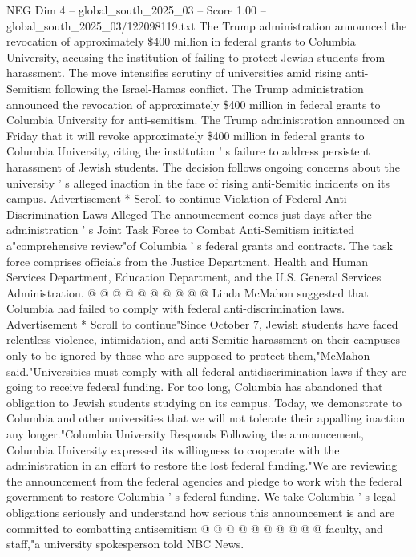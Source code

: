 \begin{textsample}{NEG Dim 4 – global\_south\_2025\_03 – Score 1.00 – global\_south\_2025\_03/122098119.txt}  \label{ex:f4_neg_422}
The Trump administration announced the revocation of approximately \$400 million in federal grants to Columbia University, accusing the institution of failing to protect Jewish students from harassment.
The move intensifies scrutiny of universities amid rising anti-Semitism following the Israel-Hamas conflict.
The Trump administration announced the revocation of approximately \$400 million in federal grants to Columbia University for anti-semitism.
The Trump administration announced on Friday that it will revoke approximately \$400 million in federal grants to Columbia University, citing the institution ' s failure to address persistent harassment of Jewish students.
The decision follows ongoing concerns about the university ' s alleged inaction in the face of rising anti-Semitic incidents on its campus.
Advertisement * Scroll to continue Violation of Federal Anti-Discrimination Laws Alleged The announcement comes just days after the administration ' s Joint Task Force to Combat Anti-Semitism initiated a"comprehensive review"of Columbia ' s federal grants and contracts.
The task force comprises officials from the Justice Department, Health and Human Services Department, Education Department, and the U.S.
General Services Administration. @ @ @ @ @ @ @ @ @ @ Linda McMahon suggested that Columbia had failed to comply with federal anti-discrimination laws.
Advertisement * Scroll to continue"Since October 7, Jewish students have faced relentless violence, intimidation, and anti-Semitic harassment on their campuses -- only to be ignored by those who are supposed to protect them,"McMahon said."Universities must comply with all federal antidiscrimination laws if they are going to receive federal funding.
For too long, Columbia has abandoned that obligation to Jewish students studying on its campus.
Today, we demonstrate to Columbia and other universities that we will not tolerate their appalling inaction any longer."Columbia University Responds Following the announcement, Columbia University expressed its willingness to cooperate with the administration in an effort to restore the lost federal funding."We are reviewing the announcement from the federal agencies and pledge to work with the federal government to restore Columbia ' s federal funding.
We take Columbia ' s legal obligations seriously and understand how serious this announcement is and are committed to combatting antisemitism @ @ @ @ @ @ @ @ @ @ faculty, and staff,"a university spokesperson told NBC News.

\end{textsample}
